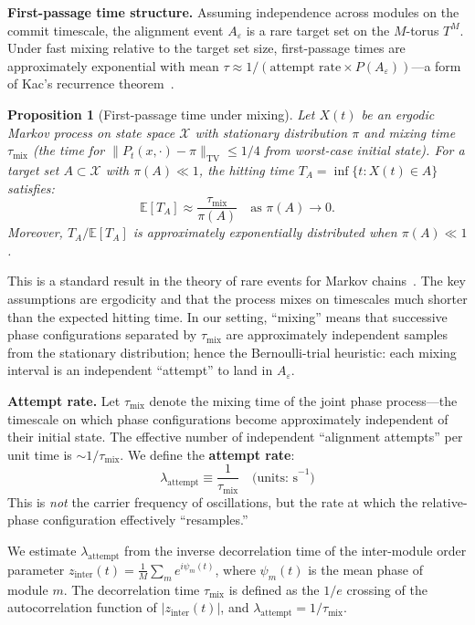 \documentclass[12pt]{article}
\newtheorem{proposition}{Proposition}
\begin{document}
\textbf{First-passage time structure.} Assuming independence across modules on the commit timescale, the alignment event $A_\varepsilon$ is a rare target set on the $M$-torus $T^M$. Under fast mixing relative to the target set size, first-passage times are approximately exponential with mean $\tau \approx 1/(\text{attempt rate} \times P(A_\varepsilon))$---a form of Kac's recurrence theorem~\cite{kac1947}.

\begin{proposition}[First-passage time under mixing]\label{prop:fpt}
Let $X(t)$ be an ergodic Markov process on state space $\mathcal{X}$ with stationary distribution $\pi$ and mixing time $\tau_{\mathrm{mix}}$ (the time for $\|P_t(x, \cdot) - \pi\|_{\mathrm{TV}} \leq 1/4$ from worst-case initial state). For a target set $A \subset \mathcal{X}$ with $\pi(A) \ll 1$, the hitting time $T_A = \inf\{t : X(t) \in A\}$ satisfies:
\[
\mathbb{E}[T_A] \approx \frac{\tau_{\mathrm{mix}}}{\pi(A)} \quad \text{as } \pi(A) \to 0.
\]
Moreover, $T_A / \mathbb{E}[T_A]$ is approximately exponentially distributed when $\pi(A) \ll 1$.
\end{proposition}
\noindent This is a standard result in the theory of rare events for Markov chains~\cite{kac1947}. The key assumptions are ergodicity and that the process mixes on timescales much shorter than the expected hitting time. In our setting, ``mixing'' means that successive phase configurations separated by $\tau_{\mathrm{mix}}$ are approximately independent samples from the stationary distribution; hence the Bernoulli-trial heuristic: each mixing interval is an independent ``attempt'' to land in $A_\varepsilon$.

\textbf{Attempt rate.} Let $\tau_{\mathrm{mix}}$ denote the mixing time of the joint phase process---the timescale on which phase configurations become approximately independent of their initial state. The effective number of independent ``alignment attempts'' per unit time is $\sim 1/\tau_{\mathrm{mix}}$. We define the \textbf{attempt rate}:
\[
\lambda_{\mathrm{attempt}} \equiv \frac{1}{\tau_{\mathrm{mix}}} \quad \text{(units: s}^{-1}\text{)}
\]
This is \emph{not} the carrier frequency of oscillations, but the rate at which the relative-phase configuration effectively ``resamples.''

We estimate $\lambda_{\mathrm{attempt}}$ from the inverse decorrelation time of the inter-module order parameter $z_{\mathrm{inter}}(t) = \frac{1}{M}\sum_m e^{i\psi_m(t)}$, where $\psi_m(t)$ is the mean phase of module $m$. The decorrelation time $\tau_{\mathrm{mix}}$ is defined as the $1/e$ crossing of the autocorrelation function of $|z_{\mathrm{inter}}(t)|$, and $\lambda_{\mathrm{attempt}} = 1/\tau_{\mathrm{mix}}$.
\end{document}
